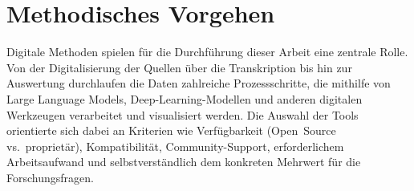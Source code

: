 \documentclass[12pt, a4paper, ngerman, bidi=default]{article}
\begin{document}



\section{Methodisches Vorgehen}

Digitale Methoden spielen für die Durchführung dieser Arbeit eine zentrale Rolle. Von der Digitalisierung der Quellen
über die Transkription bis hin zur Auswertung durchlaufen die Daten zahlreiche Prozessschritte, die mithilfe von Large 
Language Models, Deep-Learning-Modellen und anderen digitalen Werkzeugen verarbeitet und visualisiert werden. 
Die Auswahl der Tools orientierte sich dabei an Kriterien wie Verfügbarkeit (Open~Source vs.\ proprietär), 
Kompatibilität, Community-Support, erforderlichem Arbeitsaufwand und selbstverständlich dem konkreten Mehrwert für 
die Forschungsfragen.
\end{document}
